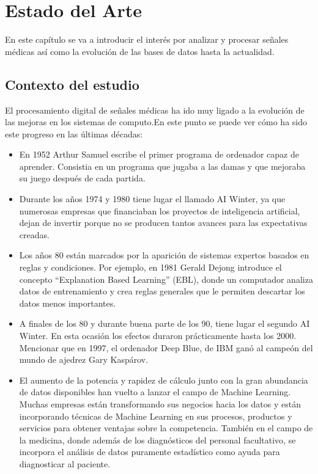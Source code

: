 \chapter{Estado del Arte}

	En este capítulo se va a introducir el interés por analizar y procesar señales médicas así como la evolución de las bases de datos hasta la actualidad.\par 
\section{Contexto del estudio}
	El procesamiento digital de señales médicas ha ido muy ligado a la evolución de
las mejoras en los sistemas de computo.En este punto se puede ver cómo ha sido este
progreso en las últimas décadas:
\begin{itemize}
\item En 1952 Arthur Samuel escribe el primer programa de ordenador capaz de aprender. Consistia en un programa que jugaba a las damas y que mejoraba su juego después de cada partida.
\item Durante los años 1974 y 1980 tiene lugar el llamado AI Winter, ya que numerosas
empresas que financiaban los proyectos de inteligencia artificial, dejan de invertir
porque no se producen tantos avances para las expectativas creadas.
\item Los años 80 están marcados por la aparición de sistemas expertos basados en reglas y condiciones. Por ejemplo, en 1981 Gerald Dejong introduce el concepto “Explanation Based Learning” (EBL), donde un computador analiza datos de entrenamiento y crea reglas generales que le permiten descartar los datos menos importantes.
\item A finales de los 80 y durante buena parte de los 90, tiene lugar el segundo AI Winter. En esta ocasión los efectos duraron prácticamente hasta los 2000. Mencionar que en 1997, el ordenador Deep Blue, de IBM ganó al campeón del mundo de ajedrez Gary Kaspárov.
\item El aumento de la potencia y rapidez de cálculo junto con la gran abundancia de datos disponibles han vuelto a lanzar el campo de Machine Learning. Muchas empresas están transformando sus negocios hacia los datos y están incorporando técnicas de Machine Learning en sus procesos, productos y servicios para obtener ventajas sobre la competencia. También en el campo de la medicina, donde además de los diagnósticos del personal facultativo, se incorpora el análisis de datos puramente estadístico como ayuda para diagnosticar al paciente.
\end{itemize}

